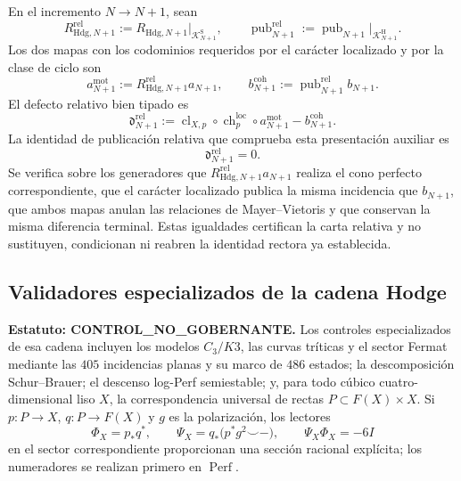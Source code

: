 En el incremento \(N\to N+1\), sean
\[
 R_{\mathrm{Hdg},N+1}^{\mathrm{rel}}
 :=R_{\mathrm{Hdg},N+1}\big|_{\mathscr K^{\mathrm S}_{N+1}},
 \qquad
 \operatorname{pub}_{N+1}^{\mathrm{rel}}
 :=\operatorname{pub}_{N+1}\big|_{\mathscr K^{\mathrm H}_{N+1}}.
\]
Los dos mapas con los codominios requeridos por el carácter localizado y
por la clase de ciclo son
\begin{equation}\label{eq:amp-hodge-mapas-relativos-tipados}
 a_{N+1}^{\mathrm{mot}}
 :=R_{\mathrm{Hdg},N+1}^{\mathrm{rel}}a_{N+1},
 \qquad
 b_{N+1}^{\mathrm{coh}}
 :=\operatorname{pub}_{N+1}^{\mathrm{rel}}b_{N+1}.
\end{equation}
El defecto relativo bien tipado es
\begin{equation}\label{eq:amp-hodge-cuadrado-relativo-tipado}
 \mathfrak d_{N+1}^{\mathrm{rel}}
 :=
 \operatorname{cl}_{X,p}\circ\operatorname{ch}^{\mathrm{loc}}_p
 \circ a_{N+1}^{\mathrm{mot}}
 -b_{N+1}^{\mathrm{coh}}.
\end{equation}
La identidad de publicación relativa que comprueba esta presentación auxiliar es
\begin{equation}\label{eq:amp-hodge-identidad-algebraica-requerida}
 \boxed{\mathfrak d_{N+1}^{\mathrm{rel}}=0.}
\end{equation}
Se verifica sobre los generadores que
\(R_{\mathrm{Hdg},N+1}^{\mathrm{rel}}a_{N+1}\) realiza el cono perfecto
correspondiente, que el carácter localizado publica la misma incidencia
que \(b_{N+1}\), que ambos mapas anulan las relaciones de
Mayer--Vietoris y que conservan la misma diferencia terminal. Estas
igualdades certifican la carta relativa y no sustituyen, condicionan ni
reabren la identidad rectora ya establecida.

\subsection{Validadores especializados de la cadena Hodge}

\noindent\textbf{Estatuto: CONTROL\_NO\_GOBERNANTE.}
Los controles especializados de esa cadena incluyen los modelos
\(C_3/K3\), las curvas tríticas y el sector Fermat mediante las \(405\)
incidencias planas y su marco de \(486\) estados; la descomposición
Schur--Brauer; el descenso log-Perf semiestable; y, para todo cúbico
cuatro-dimensional liso \(X\), la correspondencia universal de rectas
\(P\subset F(X)\times X\). Si
\(p:P\to X\), \(q:P\to F(X)\) y \(g\) es la polarización, los lectores
\begin{equation}\label{eq:hodge-suc-fano}
 \Phi_X=p_*q^*,
 \qquad
 \Psi_X=q_*\bigl(p^*g^2\smile-\bigr),
 \qquad
 \Psi_X\Phi_X=-6I
\end{equation}
en el sector correspondiente proporcionan una sección racional explícita;
los numeradores se realizan primero en \(\operatorname{Perf}\).

